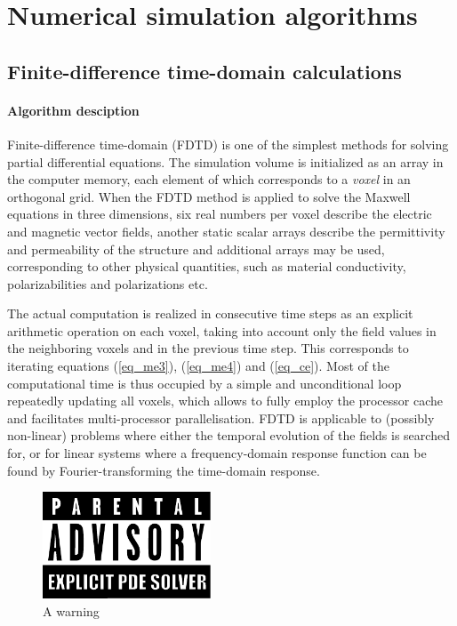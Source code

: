 \section{Numerical simulation algorithms} \label{chapter_numerical}
\subsection{Finite-difference time-domain calculations}
\paragraph{Algorithm desciption} %
Finite-difference time-domain (FDTD) is one of the simplest methods for solving partial differential equations. The simulation volume is initialized as an array in the computer memory, each element of which corresponds to a \textit{voxel} in an orthogonal grid. When the FDTD method is applied to solve the Maxwell equations in three dimensions, six real numbers per voxel describe the electric and magnetic vector fields, another static scalar arrays describe the permittivity and permeability of the structure and additional arrays may be used, corresponding to other physical quantities, such as material conductivity, polarizabilities and polarizations etc. 

The actual computation is realized in consecutive time steps as an explicit arithmetic operation on each voxel, taking into account only the field values in the neighboring voxels and in the previous time step. This corresponds to iterating equations (\ref{eq_me3}), (\ref{eq_me4}) and (\ref{eq_ce}). %
Most of the computational time is thus occupied by a simple and unconditional loop repeatedly updating all voxels, which allows to fully employ the processor cache and facilitates multi-processor parallelisation. FDTD is applicable to (possibly non-linear) problems where either the temporal evolution of the fields is searched for, or for linear systems where a frequency-domain response function can be found by Fourier-transforming the time-domain response. 
\begin{figure}[ht] \caption{A warning} \label{fg_parental} \centering 
	\includegraphics[width=5cm]{img/Parental_Advisory_label.pdf}
\end{figure}

